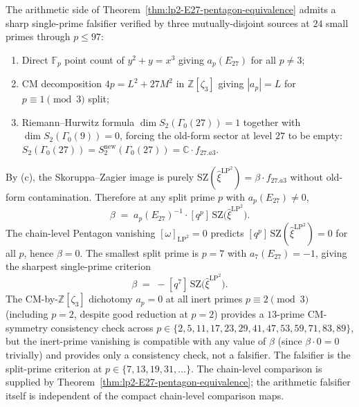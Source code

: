 \begin{remark}[Split-prime falsifier for \texorpdfstring{$\beta = 0$}{beta = 0} at \texorpdfstring{$p = 7$}{p = 7}]
\label{rem:lp2-E27-split-prime-falsifier}
The arithmetic side of Theorem~\ref{thm:lp2-E27-pentagon-equivalence}
admits a sharp single-prime falsifier verified by three mutually-disjoint
sources at $24$ small primes through $p \leq 97$:
\begin{enumerate}[label=\textup{(\alph*)}]
\item Direct $\mathbb{F}_p$ point count of $y^2 + y = x^3$ giving
 $a_p(E_{27})$ for all $p \neq 3$;
\item CM decomposition $4p = L^2 + 27 M^2$ in $\mathbb{Z}[\zeta_3]$
 giving $|a_p| = L$ for $p \equiv 1 \!\!\!\pmod 3$ split;
\item Riemann--Hurwitz formula $\dim S_2(\Gamma_0(27)) = 1$ together with
 $\dim S_2(\Gamma_0(9)) = 0$, forcing the old-form sector at level
 $27$ to be empty:
 $S_2(\Gamma_0(27)) = S_2^{\mathrm{new}}(\Gamma_0(27)) =
 \mathbb{C} \cdot f_{27.a3}$.
\end{enumerate}
By (c), the Skoruppa--Zagier image is purely
$\mathrm{SZ}(\widehat{\xi}^{\mathrm{LP}^2}) = \beta \cdot f_{27.a3}$
without old-form contamination. Therefore at any split prime $p$ with
$a_p(E_{27}) \neq 0$,
$$
\beta \;=\; a_p(E_{27})^{-1} \cdot
[q^p] \, \mathrm{SZ}\bigl(\widehat{\xi}^{\mathrm{LP}^2}\bigr).
$$
The chain-level Pentagon vanishing
$[\omega]_{\mathrm{LP}^2} = 0$ predicts
$[q^p]\,\mathrm{SZ}(\widehat{\xi}^{\mathrm{LP}^2}) = 0$ for all $p$,
hence $\beta = 0$. The smallest split prime is $p = 7$ with
$a_7(E_{27}) = -1$, giving the sharpest single-prime criterion
$$
\beta \;=\; -[q^7] \, \mathrm{SZ}\bigl(\widehat{\xi}^{\mathrm{LP}^2}\bigr).
$$
The CM-by-$\mathbb{Z}[\zeta_3]$ dichotomy $a_p = 0$ at all inert primes
$p \equiv 2 \!\!\!\pmod 3$ (including $p = 2$, despite good reduction at
$p = 2$) provides a $13$-prime CM-symmetry consistency check across
$p \in \{2, 5, 11, 17, 23, 29, 41, 47, 53, 59, 71, 83, 89\}$, but the
inert-prime vanishing is compatible with any value of $\beta$ (since
$\beta \cdot 0 = 0$ trivially) and provides only a consistency check,
not a falsifier. The falsifier is the split-prime criterion at
$p \in \{7, 13, 19, 31, \ldots\}$. The chain-level
comparison is supplied by Theorem~\ref{thm:lp2-E27-pentagon-equivalence};
the arithmetic falsifier itself is independent of the compact
chain-level comparison maps.
\end{remark}

